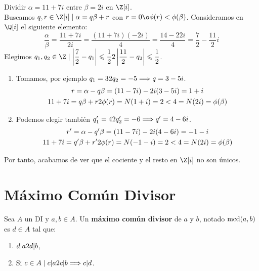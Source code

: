 \begin{ejemplo}
    Dividir $\alpha=11+7i$ entre $\beta=2i$ en $\Z[i]$.\\
    
    Buscamos $q,r \in \Z[i] \mid \alpha = q\beta +r$ con $r=0 \o \phi(r) < \phi(\beta)$. Consideramos en $\Q[i]$ el siguiente elemento:
    $$\dfrac{\alpha}{\beta} = \dfrac{11+7i}{2i} = \dfrac{(11+7i)(-2i)}{4} = \dfrac{14-22i}{4} = \dfrac{7}{2} - \dfrac{11}{2}i$$
    Elegimos $q_1, q_2 \in \Z \mid \left|\dfrac{7}{2}-q_1\right|\leq \dfrac{1}{2} \y \left|\dfrac{11}{2}-q_2\right|\leq \dfrac{1}{2}$.
    \begin{enumerate}
        \item Tomamos, por ejemplo $q_1=3 2 q_2 = -5 \Longrightarrow q=3-5i$.
        \begin{gather*}
            r=\alpha-q\beta = (11-7i)-2i(3-5i) = 1+i \\
            11+7i = q\beta + r 2 \phi(r) = N(1+i) = 2 < 4 = N(2i) = \phi(\beta)
        \end{gather*}

        \item Podemos elegir también $q_1'=4 2 q_2'=-6 \Longrightarrow q' = 4-6i$.
        \begin{gather*}
            r'=\alpha-q'\beta = (11-7i)-2i(4-6i) = -1-i \\
            11+7i = q'\beta + r' 2 \phi(r) = N(-1-i) = 2 < 4 = N(2i) = \phi(\beta)
        \end{gather*}
    \end{enumerate}

    Por tanto, acabamos de ver que el cociente y el resto en $\Z[i]$ no son únicos.
\end{ejemplo}



\section{Máximo Común Divisor}
\begin{definicion}
    Sea $A$ un DI y $a,b \in A$. Un \textbf{máximo común divisor} de $a$ y $b$, notado $\operatorname{mcd}(a,b)$ es $d \in A$ tal que:
    \begin{enumerate}
        \item $d|a 2 d|b$,
        \item Si $c\in A \mid c|a 2 c|b \Longrightarrow c|d$.
    \end{enumerate}
\end{definicion}

